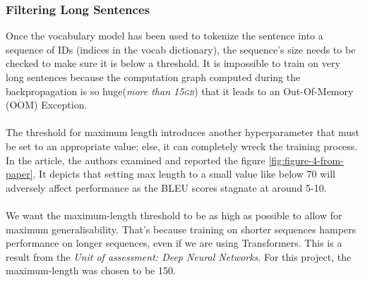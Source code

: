 \documentclass[12pt,a4paper,twoside,openright]{report}
\begin{document}
\subsubsection{Filtering Long Sentences}
Once the vocabulary model has been used to tokenize the sentence into a sequence of IDs (indices in the vocab dictionary), the sequence's size needs to be checked to make sure it is below a threshold. It is impossible to train on very long sentences because the computation graph computed during the backpropagation is so huge(\textit{more than 15\textsc{gb}}) that it leads to an Out-Of-Memory (OOM) Exception.
\\\\
The threshold for maximum length introduces another hyperparameter that must be set to an appropriate value; else, it can completely wreck the training process. In the article\cite{training-tips}, the authors examined and reported the figure \ref{fig:figure-4-from-paper}. It depicts that setting max length to a small value like below 70 will adversely affect performance as the BLEU scores stagnate at around 5-10.
\\\\
We want the maximum-length threshold to be as high as possible to allow for maximum generalisability. That's because training on shorter sequences hampers performance on longer sequences, even if we are using Transformers. This is a result from the \textit{Unit of assessment: Deep Neural Networks}. For this project, the maximum-length was chosen to be 150.

\end{document}
